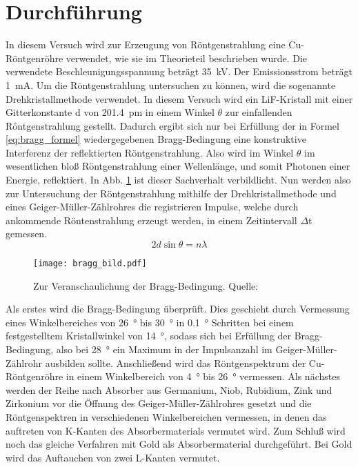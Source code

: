 
\section{Durchführung}
%
In diesem Versuch wird zur Erzeugung von Röntgenstrahlung eine Cu-Röntgenröhre verwendet, wie sie im Theorieteil beschrieben wurde. Die verwendete Beschleunigungsspannung beträgt \SI{35}{\kilo\volt}. Der Emissionsstrom beträgt \SI{1}{\milli\ampere}.
Um die Röntgenstrahlung untersuchen zu können, wird die sogenannte Drehkristallmethode verwendet. In diesem Versuch wird ein LiF-Kristall mit einer Gitterkonstante d von \SI{201.4}{\pico\metre} in einem Winkel $\theta$ zur einfallenden Röntgenstrahlung gestellt. Dadurch ergibt sich nur bei Erfüllung der in Formel \eqref{eq:bragg_formel} wiedergegebenen Bragg-Bedingung eine konstruktive Interferenz der reflektierten Röntgenstrahlung. Also wird im Winkel $\theta$ im wesentlichen bloß Röntgenstrahlung einer Wellenlänge, und somit Photonen einer Energie, reflektiert. In Abb. \ref{fig:bragg_bild} ist dieser Sachverhalt verbildlicht.
Nun werden also zur Untersuchung der Röntgenstrahlung mithilfe der Drehkristallmethode und eines Geiger-Müller-Zählrohres die registrieren Impulse, welche durch ankommende Röntenstrahlung erzeugt werden, in einem Zeitintervall $\Delta$t gemessen.
%
\begin{equation}
2 d \sin{\theta} = n \lambda
\label{eq:bragg_formel}
\end{equation}
%
%
\begin{figure}
\centering
\texttt{[image: bragg\_bild.pdf]}
\caption{Zur Veranschaulichung der Bragg-Bedingung. Quelle: \textcite{v602}}
\label{fig:bragg_bild}
\end{figure}
%
Als erstes wird die Bragg-Bedingung überprüft. Dies geschieht durch Vermessung eines Winkelbereiches von \SI{26}{\degree} bis \SI{30}{\degree} in \SI{0.1}{\degree} Schritten bei einem festgestelltem Kristallwinkel von \SI{14}{\degree}, sodass sich bei Erfüllung der Bragg-Bedingung, also bei \SI{28}{\degree} ein Maximum in der Impulsanzahl im Geiger-Müller-Zählrohr ausbilden sollte.
Anschließend wird das Röntgenspektrum der Cu-Röntgenröhre in einem Winkelbereich von \SI{4}{\degree} bis \SI{26}{\degree} vermessen.
Als nächstes werden der Reihe nach Absorber aus Germanium, Niob, Rubidium, Zink und Zirkonium vor die Öffnung des Geiger-Müller-Zählrohres gesetzt und die Röntgenspektren in verschiedenen Winkelbereichen vermessen, in denen das auftreten von K-Kanten des Absorbermaterials vermutet wird.
Zum Schluß wird noch das gleiche Verfahren mit Gold als Absorbermaterial durchgeführt. Bei Gold wird das Auftauchen von zwei L-Kanten vermutet.
%